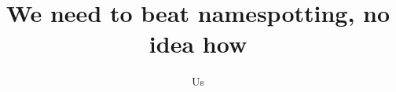 \documentclass[preprint,12pt]{elsarticle}
\begin{document}
\begin{frontmatter}



\title{We need to beat namespotting, no idea how}


\author{Us}



\end{frontmatter}
\end{document}
